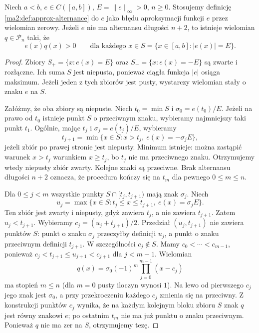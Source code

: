 \begin{lemat}
\label{ma2:lem:approx-sign-polynomial}
Niech $a<b$, $e\in C([a,b])$, $E=\|e\|_\infty>0$,
$n\ge0$. Stosujemy definicję
\ref{ma2:def:approx-alternance} do $e$ jako błędu
aproksymacji funkcji $e$ przez wielomian zerowy.
Jeżeli $e$ nie ma alternansu długości
$n+2$, to istnieje wielomian $q\in\mathcal P_n$
taki, że
\[
 e(x)q(x)>0\qquad\text{dla każdego }
 x\in S=\{x\in[a,b]:|e(x)|=E\}.
\]
\end{lemat}
\begin{proof}
Zbiory $S_+=\{x:e(x)=E\}$ oraz
$S_-=\{x:e(x)=-E\}$ są zwarte i rozłączne.
Ich suma $S$ jest niepusta, ponieważ ciągła
funkcja $|e|$ osiąga maksimum.
Jeżeli jeden z tych zbiorów jest pusty,
wystarczy wielomian stały o znaku $e$ na $S$.

Załóżmy, że oba zbiory są niepuste.
Niech $t_0=\min S$ i $\sigma_0=e(t_0)/E$.
Jeżeli na prawo od $t_0$ istnieje punkt $S$
o przeciwnym znaku, wybieramy najmniejszy taki
punkt $t_1$. Ogólnie, mając $t_j$ i
$\sigma_j=e(t_j)/E$, wybieramy
\[
 t_{j+1}=\min\{x\in S:x>t_j,\ e(x)=-\sigma_j E\},
\]
jeżeli zbiór po prawej stronie jest niepusty.
Minimum istnieje: można zastąpić warunek $x>t_j$
warunkiem $x\ge t_j$, bo $t_j$ nie ma
przeciwnego znaku. Otrzymujemy wtedy niepusty
zbiór zwarty. Kolejne znaki są przeciwne.
Brak alternansu długości $n+2$ oznacza, że
procedura kończy się na $t_m$ dla pewnego
$0\le m\le n$.

Dla $0\le j<m$ wszystkie punkty
$S\cap[t_j,t_{j+1})$ mają znak $\sigma_j$.
Niech
\[
 u_j=\max\{x\in S:t_j\le x\le t_{j+1},
                       \ e(x)=\sigma_j E\}.
\]
Ten zbiór jest zwarty i niepusty, gdyż
zawiera $t_j$, a nie zawiera $t_{j+1}$.
Zatem $u_j<t_{j+1}$.
Wybieramy $c_j=(u_j+t_{j+1})/2$.
Przedział $(u_j,t_{j+1})$ nie zawiera punktów $S$:
punkt o znaku $\sigma_j$ przeczyłby definicji
$u_j$, a punkt o znaku przeciwnym definicji
$t_{j+1}$. W szczególności $c_j\notin S$.
Mamy $c_0<\cdots<c_{m-1}$, ponieważ
$c_j<t_{j+1}\le u_{j+1}<c_{j+1}$ dla $j<m-1$.
Wielomian
\[
 q(x)=\sigma_0(-1)^m\prod_{j=0}^{m-1}(x-c_j)
\]
ma stopień $m\le n$ (dla $m=0$ pusty iloczyn
wynosi $1$). Na lewo od pierwszego $c_j$
jego znak jest $\sigma_0$, a przy przekroczeniu
każdego $c_j$ zmienia się na przeciwny.
Z konstrukcji punktów $c_j$ wynika, że
na każdym kolejnym bloku zbioru $S$ znak $q$
jest równy znakowi $e$; po ostatnim $t_m$
nie ma już punktu o znaku przeciwnym.
Ponieważ $q$ nie ma zer na $S$, otrzymujemy tezę.
\end{proof}

